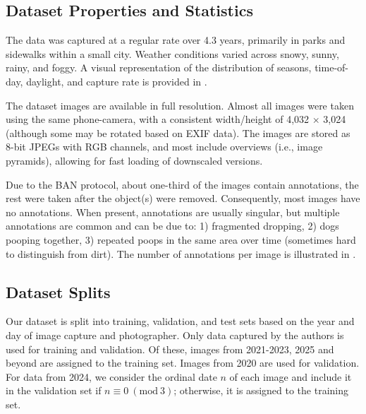 \documentclass{article}
\begin{document}
\subsection{Dataset Properties and Statistics}
\label{subsec:datastat}



The data was captured at a regular rate over 4.3 years, primarily in parks and sidewalks within a small
  city.
Weather conditions varied across snowy, sunny, rainy, and foggy.
A visual representation of the distribution of seasons, time-of-day, daylight, and capture rate is provided
  in .

The dataset images are available in full resolution.
Almost all images were taken using the same phone-camera, with a consistent width/height of 4,032
  $\times$ 3,024 (although some may be rotated based on EXIF data).
The images are stored as 8-bit JPEGs with RGB channels, and most include overviews (i.e., image pyramids),
  allowing for fast loading of downscaled versions.


Due to the BAN protocol, about one-third of the images contain
annotations, the rest were taken after the object(s) were removed.  Consequently, most
images have no annotations. When present, annotations are usually singular, but
multiple annotations are common and can be due to:
1) fragmented dropping,
2) dogs pooping together,
3) repeated poops in the same area over time (sometimes hard to distinguish from dirt).
The number of annotations per image is illustrated in .


\subsection{Dataset Splits}

Our dataset is split into training, validation, and test sets based on the year and day of image capture and
  photographer.
Only data captured by the authors is used for training and validation.
Of these, images from 2021-2023, 2025 and beyond are assigned to the training set. 
Images from 2020 are used for
  validation.
For data from 2024, we consider the ordinal date $n$ of each image and include it in the validation set if
  $n \equiv 0 \ (\textrm{mod}\ 3)$; otherwise, it is assigned to the training set.
\end{document}
